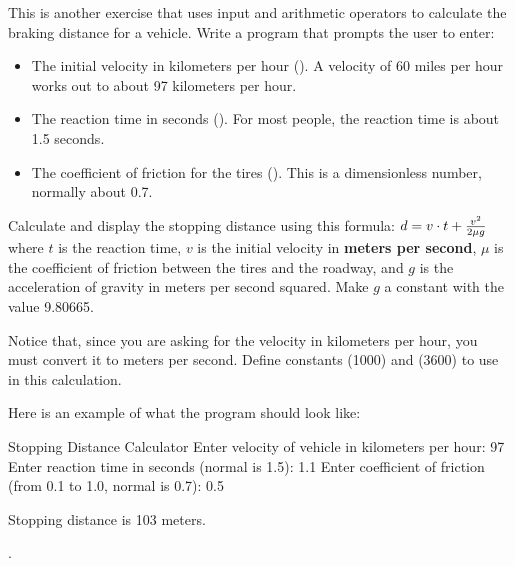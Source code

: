 \begin{exercise}
\label{brakingDistance}

This is another exercise that uses input and arithmetic operators to calculate the braking distance for a vehicle. Write a program that prompts the user to enter:

\begin{itemize}

\item The initial velocity in kilometers per hour (). A velocity of 60 miles per hour works out to about 97 kilometers per hour.
\item The reaction time in seconds (). For most people, the reaction time is about 1.5 seconds.
\item The coefficient of friction for the tires (). This is a dimensionless number, normally about 0.7.

\end{itemize}

Calculate and display the stopping distance using this formula:
$d = v \cdot t + {v^2 \over {2 \mu g}}$
where $t$ is the reaction time, $v$ is the initial velocity in {\bf meters per second}, $\mu$ is the coefficient of friction between the tires and the roadway, and $g$ is the acceleration of gravity in meters per second squared. Make $g$ a constant with the value 9.80665.

Notice that, since you are asking for the velocity in kilometers per hour, you must convert it to meters per second. Define constants  (1000) and  (3600) to use in this calculation.

Here is an example of what the program should look like:

\begin{stdout}
Stopping Distance Calculator
Enter velocity of vehicle in kilometers per hour: 97
Enter reaction time in seconds (normal is 1.5): 1.1
Enter coefficient of friction (from 0.1 to 1.0, normal is 0.7): 0.5

Stopping distance is 103 meters.
\end{stdout}.
\end{exercise}

